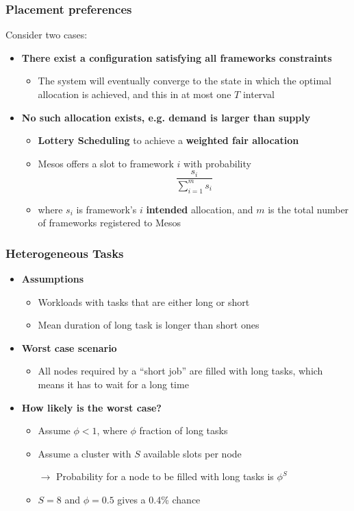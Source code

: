 \begin{frame}
\frametitle{Placement preferences}
Consider two cases:
\begin{itemize}
	\item {\bf There exist a configuration satisfying all frameworks constraints}
	\begin{itemize}
		\item The system will eventually converge to the state in which the optimal allocation is achieved, and this in at most one $T$ interval
	\end{itemize}
	\item {\bf No such allocation exists, e.g. demand is larger than supply}
	\begin{itemize}
		\item {\bf Lottery Scheduling} to achieve a {\bf weighted fair allocation}
		\item Mesos offers a slot to framework $i$ with probability 
		$$ \frac{s_i}{\sum_{i=1}^{m}s_i} $$
		\item where $s_i$ is framework's $i$ {\bf intended} allocation, and $m$ is the total number of frameworks registered to Mesos
	\end{itemize}
\end{itemize}
\end{frame}

\begin{frame}
\frametitle{Heterogeneous Tasks}
\begin{itemize}
	\item {\bf Assumptions}
	\begin{itemize}
		\item Workloads with tasks that are either long or short
		\item Mean duration of long task is longer than short ones
	\end{itemize}
	\item {\bf Worst case scenario}
	\begin{itemize}
		\item All nodes required by a ``short job'' are filled with long tasks, which means it has to wait for a long time
	\end{itemize}
	\item {\bf How likely is the worst case?}
	\begin{itemize}
		\item Assume $\phi < 1$, where $\phi$ fraction of long tasks
		\item Assume a cluster with $S$ available slots per node
		\item[$\to$] Probability for a node to be filled with long tasks is $\phi^S$
		\item $S=8$ and $\phi = 0.5$ gives a 0.4\% chance 
	\end{itemize}
\end{itemize}
\end{frame}

